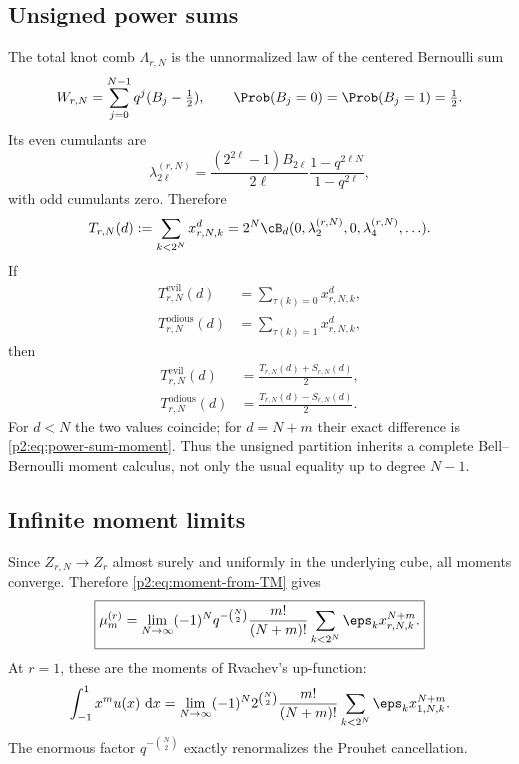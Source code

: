 \documentclass[11pt,oneside]{article}
\theoremstyle{definition}
\newcommand{\dd}{\,\mathrm d}
\begin{document}
\subsection{Unsigned power sums}

The total knot comb $\Lambda_{r,N}$ is the unnormalized law of the centered
Bernoulli sum
\begin{equation}
 W_{r,N}=\sum_{j=0}^{N-1}q^j(B_j-\tfrac12),
 \qquad \Prob(B_j=0)=\Prob(B_j=1)=\tfrac12.                \label{p2:eq:W-rN}
\end{equation}
Its even cumulants are
\begin{equation}
 \lambda_{2\ell}^{(r,N)}
 =\frac{(2^{2\ell}-1)B_{2\ell}}{2\ell}
   \frac{1-q^{2\ell N}}{1-q^{2\ell}},                    \label{p2:eq:Bernoulli-knot-cumulants}
\end{equation}
with odd cumulants zero.  Therefore
\begin{equation}
 T_{r,N}(d):=\sum_{k<2^N}x_{r,N,k}^d
 =2^N\cB_d(0,\lambda_2^{(r,N)},0,\lambda_4^{(r,N)},\ldots). \label{p2:eq:total-knot-power}
\end{equation}
If
\begin{align}
 T_{r,N}^{\mathrm{evil}}(d)&=\sum_{\tau(k)=0}x_{r,N,k}^d, \\
 T_{r,N}^{\mathrm{odious}}(d)&=\sum_{\tau(k)=1}x_{r,N,k}^d,
\end{align}
then
\begin{align}
 T_{r,N}^{\mathrm{evil}}(d)
 &=\frac{T_{r,N}(d)+S_{r,N}(d)}2,                          \label{p2:eq:evil-power}\\
 T_{r,N}^{\mathrm{odious}}(d)
 &=\frac{T_{r,N}(d)-S_{r,N}(d)}2.                          \label{p2:eq:odious-power}
\end{align}
For $d<N$ the two values coincide; for $d=N+m$ their exact difference is
\eqref{p2:eq:power-sum-moment}.  Thus the unsigned partition inherits a complete
Bell--Bernoulli moment calculus, not only the usual equality up to degree
$N-1$.

\subsection{Infinite moment limits}

Since $Z_{r,N}\to Z_r$ almost surely and uniformly in the underlying cube,
all moments converge.  Therefore \eqref{p2:eq:moment-from-TM} gives
\begin{equation}
 \boxed{\displaystyle
 \mu_m^{(r)}
 =\lim_{N\to\infty}(-1)^Nq^{-\binom N2}\frac{m!}{(N+m)!}
 \sum_{k<2^N}\eps_kx_{r,N,k}^{N+m}.}                     \label{p2:eq:sparse-moment-TM-limit}
\end{equation}
At $r=1$, these are the moments of Rvachev's up-function:
\begin{equation}
 \int_{-1}^{1}x^m u(x)\,\dd x
 =\lim_{N\to\infty}(-1)^N2^{\binom N2}\frac{m!}{(N+m)!}
 \sum_{k<2^N}\eps_kx_{1,N,k}^{N+m}.                      \label{p2:eq:up-moment-TM-limit}
\end{equation}
The enormous factor $q^{-\binom N2}$ exactly renormalizes the Prouhet
cancellation.
\end{document}

